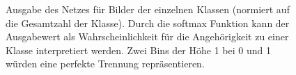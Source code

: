 \begin{figure}[h!]
  \hspace{8pt}
  \hspace{8pt}
  \caption{Ausgabe des Netzes für Bilder der einzelnen Klassen (normiert auf die Gesamtzahl der Klasse). Durch die softmax Funktion kann der Ausgabewert als Wahrscheinlichkeit für die Angehörigkeit zu einer Klasse interpretiert werden. Zwei Bins der Höhe 1 bei 0 und 1 würden eine perfekte Trennung repräsentieren.}
\end{figure}
%
